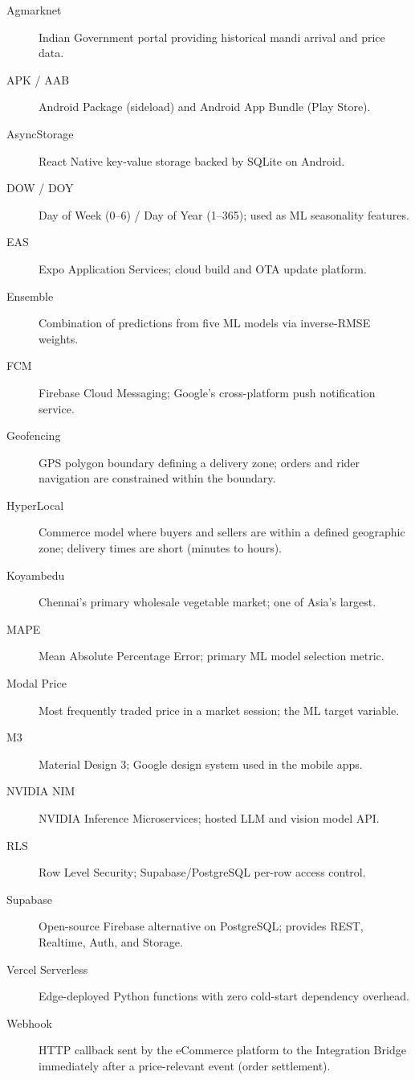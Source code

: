 \documentclass[12pt, a4paper, oneside]{report}
\begin{document}
\begin{description}
  \item[Agmarknet]
    Indian Government portal providing historical mandi arrival and price data.
  \item[APK / AAB]
    Android Package (sideload) and Android App Bundle (Play Store).
  \item[AsyncStorage]
    React Native key-value storage backed by SQLite on Android.
  \item[DOW / DOY]
    Day of Week (0--6) / Day of Year (1--365); used as ML seasonality features.
  \item[EAS]
    Expo Application Services; cloud build and OTA update platform.
  \item[Ensemble]
    Combination of predictions from five ML models via inverse-RMSE weights.
  \item[FCM]
    Firebase Cloud Messaging; Google's cross-platform push notification service.
  \item[Geofencing]
    GPS polygon boundary defining a delivery zone; orders and rider navigation
    are constrained within the boundary.
  \item[HyperLocal]
    Commerce model where buyers and sellers are within a defined geographic
    zone; delivery times are short (minutes to hours).
  \item[Koyambedu]
    Chennai's primary wholesale vegetable market; one of Asia's largest.
  \item[MAPE]
    Mean Absolute Percentage Error; primary ML model selection metric.
  \item[Modal Price]
    Most frequently traded price in a market session; the ML target variable.
  \item[M3]
    Material Design 3; Google design system used in the mobile apps.
  \item[NVIDIA NIM]
    NVIDIA Inference Microservices; hosted LLM and vision model API.
  \item[RLS]
    Row Level Security; Supabase/PostgreSQL per-row access control.
  \item[Supabase]
    Open-source Firebase alternative on PostgreSQL; provides REST, Realtime,
    Auth, and Storage.
  \item[Vercel Serverless]
    Edge-deployed Python functions with zero cold-start dependency overhead.
  \item[Webhook]
    HTTP callback sent by the eCommerce platform to the Integration Bridge
    immediately after a price-relevant event (order settlement).
\end{description}
\end{document}
